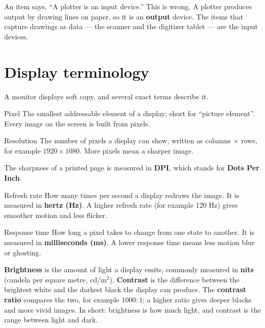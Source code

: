 \begin{example}
An item says, ``A plotter is an input device.'' This is wrong. A plotter
produces output by drawing lines on paper, so it is an \textbf{output}
device. The items that capture drawings as data --- the scanner and the
digitizer tablet --- are the input devices.
\end{example}

\section{Display terminology}
A monitor displays soft copy, and several exact terms describe it.

\begin{definitionbox}{Pixel}
The smallest addressable element of a display; short for ``picture element''.
Every image on the screen is built from pixels.
\end{definitionbox}

\begin{definitionbox}{Resolution}
The number of pixels a display can show, written as columns $\times$ rows,
for example $1920 \times 1080$. More pixels mean a sharper image.
\end{definitionbox}

The sharpness of a printed page is measured in \textbf{DPI}, which stands for
\textbf{Dots Per Inch}.

\begin{definitionbox}{Refresh rate}
How many times per second a display redraws the image. It is measured in
\textbf{hertz (Hz)}. A higher refresh rate (for example 120 Hz) gives
smoother motion and less flicker.
\end{definitionbox}

\begin{definitionbox}{Response time}
How long a pixel takes to change from one state to another. It is measured
in \textbf{milliseconds (ms)}. A lower response time means less motion blur
or ghosting.
\end{definitionbox}

\textbf{Brightness} is the amount of light a display emits, commonly measured
in \textbf{nits} (candela per square metre, cd/m$^2$). \textbf{Contrast} is
the difference between the brightest white and the darkest black the display
can produce. The \textbf{contrast ratio} compares the two, for example
$1000:1$; a higher ratio gives deeper blacks and more vivid images. In short:
brightness is how much light, and contrast is the range between light and
dark.

